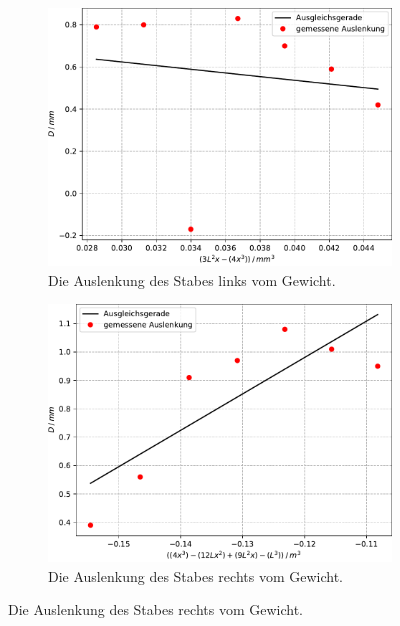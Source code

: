 \begin{figure}
    \centering
    \caption{Beidseitige Einspannung des eckigen Stabes.}
    \begin{subfigure}{0.5\textwidth} 
       \includegraphics[scale=0.5]{content/data/plot_beidseitig_eckig_links.pdf}
       \caption{Die Auslenkung des Stabes links vom Gewicht.}
       \label{fig:beid_links_eckig}
    \end{subfigure}

    \begin{subfigure}{0.5\textwidth}
        \includegraphics[scale=0.5]{content/data/plot_beidseitig_eckig_rechts.pdf}
        \caption{Die Auslenkung des Stabes rechts vom Gewicht.}
        \label{fig:beid_rechts_eckig}
    \end{subfigure}
    \label{fig:beid_eckig}
\end{figure}

